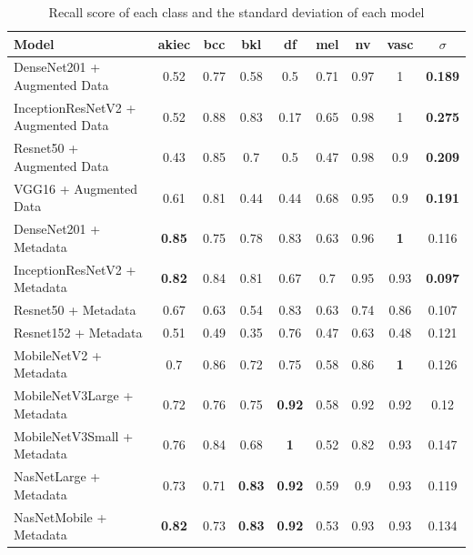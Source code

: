 \begin{table}[h]
	\centering
	\begin{tabular}{|l | c | c | c | c | c | c | c | c|} 
		\hline
		Model & akiec & bcc & bkl & df & mel & nv & vasc & $\sigma$ \\
		\hline
		DenseNet201 + Augmented Data & 0.52 & 0.77 & 0.58 & 0.5 & 0.71 & 0.97 & 1 & \textbf{0.189}\\ 
		\hline
		InceptionResNetV2 + Augmented Data & 0.52 & 0.88 & 0.83 & 0.17 & 0.65 & 0.98 & 1 & \textbf{0.275}\\
		\hline
		Resnet50 + Augmented Data & 0.43 & 0.85 & 0.7 & 0.5 & 0.47 & 0.98 & 0.9 & \textbf{0.209}\\
		\hline 	
		VGG16 + Augmented Data & 0.61 & 0.81 & 0.44 & 0.44 & 0.68 & 0.95 & 0.9 & 	\textbf{0.191}\\ 
		\hline		
		DenseNet201 + Metadata & \textbf{0.85} & 0.75 & 0.78 & 0.83 & 0.63 & 0.96 & \textbf{1} & 0.116\\
		\hline
		InceptionResNetV2 + Metadata & \textbf{0.82} & 0.84 & 0.81 & 0.67 & 0.7 & 0.95 & 	0.93 & \textbf{0.097}\\
		\hline
		Resnet50 + Metadata & 0.67 & 0.63 & 0.54 & 0.83 & 0.63 & 0.74 & 0.86 & 0.107\\
		\hline
		Resnet152 + Metadata & 0.51 & 0.49 & 0.35 & 0.76 & 0.47 & 0.63 & 0.48 & 0.121\\
		\hline
		MobileNetV2 + Metadata & 0.7 & 0.86 & 0.72 & 0.75 & 0.58 & 0.86 & \textbf{1} & 0.126\\
		\hline
		MobileNetV3Large + Metadata & 0.72 & 0.76 & 0.75 & \textbf{0.92} & 0.58 & 0.92 & 0.92 & 0.12\\
		\hline
		MobileNetV3Small + Metadata & 0.76 & 0.84 & 0.68 & \textbf{1} & 0.52 & 0.82 & 0.93 & 0.147\\
		\hline
		NasNetLarge + Metadata & 0.73 & 0.71 & \textbf{0.83} & \textbf{0.92} & 0.59 & 0.9 & 0.93 & 0.119\\
		\hline
		NasNetMobile + Metadata & \textbf{0.82} & 0.73 & \textbf{0.83} & \textbf{0.92} & 0.53 & 0.93 & 0.93 & 0.134\\
		\hline
	\end{tabular}
	\caption{Recall score of each class and the standard deviation of each model}
	\label{table:6}
\end{table}\\
